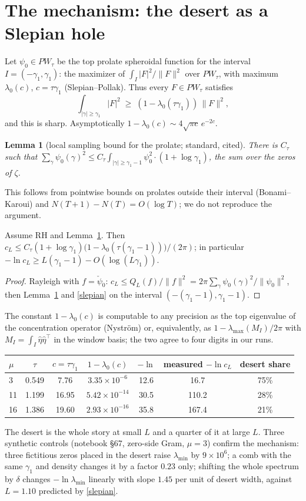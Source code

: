 \documentclass[11pt]{article}
\newtheorem{lemma}[theorem]{Lemma}\newtheorem{conjecture}[theorem]{Conjecture}
\theoremstyle{remark}\newtheorem*{remark}{Remark}
\begin{document}
\section{The mechanism: the desert as a Slepian hole}
Let $\psi_0\in PW_\tau$ be the top prolate spheroidal function for the interval $I=(-\gamma_1,\gamma_1)$: the maximizer of $\int_I|F|^2/\|F\|^2$ over $PW_\tau$, with maximum $\lambda_0(c)$, $c=\tau\gamma_1$ (Slepian--Pollak). Thus every $F\in PW_\tau$ satisfies
\begin{equation}\label{slepian}
\int_{|\gamma|\ge\gamma_1}|F|^2\;\ge\;(1-\lambda_0(\tau\gamma_1))\,\|F\|^2,
\end{equation}
and this is sharp. Asymptotically $1-\lambda_0(c)\sim4\sqrt{\pi c}\,e^{-2c}$.
\begin{lemma}[local sampling bound for the prolate; standard, cited]\label{lem}
There is $C_\tau$ such that $\sum_{\gamma}\psi_0(\gamma)^2\le C_\tau\int_{|\gamma|\ge\gamma_1-1}\psi_0^2\cdot(1+\log\gamma_1)$, the sum over the zeros of $\zeta$.
\end{lemma}
This follows from pointwise bounds on prolates outside their interval (Bonami--Karoui) and $N(T+1)-N(T)=O(\log T)$; we do not reproduce the argument.
\begin{proposition}\label{prop2}
Assume RH and Lemma~\ref{lem}. Then $c_L\le C_\tau(1+\log\gamma_1)\bigl(1-\lambda_0(\tau(\gamma_1-1))\bigr)/(2\pi)$; in particular $-\ln c_L\ge L(\gamma_1-1)-O(\log(L\gamma_1))$.
\end{proposition}
\begin{proof}
Rayleigh with $f=\check\psi_0$: $c_L\le Q_L(f)/\|f\|^2=2\pi\sum_\gamma\psi_0(\gamma)^2/\|\psi_0\|^2$, then Lemma~\ref{lem} and \eqref{slepian} on the interval $(-(\gamma_1-1),\gamma_1-1)$.
\end{proof}
The constant $1-\lambda_0(c)$ is computable to any precision as the top eigenvalue of the concentration operator (Nystr\"om) or, equivalently, as $1-\lambda_{\max}(M_I)/2\pi$ with $M_I=\int_I\hat\eta\hat\eta^{\!\top}$ in the window basis; the two agree to four digits in our runs.
\begin{center}\small
\begin{tabular}{lcccccc}\toprule
$\mu$ & $\tau$ & $c=\tau\gamma_1$ & $1-\lambda_0(c)$ & $-\ln$ & measured $-\ln c_L$ & desert share\\\midrule
3 & 0.549 & 7.76 & $3.35\times10^{-6}$ & 12.6 & 16.7 & 75\%\\
11 & 1.199 & 16.95 & $5.42\times10^{-14}$ & 30.5 & 110.2 & 28\%\\
16 & 1.386 & 19.60 & $2.93\times10^{-16}$ & 35.8 & 167.4 & 21\%\\\bottomrule
\end{tabular}
\end{center}
The desert is the whole story at small $L$ and a quarter of it at large $L$. Three synthetic controls (notebook \S67, zero-side Gram, $\mu=3$) confirm the mechanism: three fictitious zeros placed in the desert raise $\lambda_{\min}$ by $9\times10^6$; a comb with the same $\gamma_1$ and density changes it by a factor $0.23$ only; shifting the whole spectrum by $\delta$ changes $-\ln\lambda_{\min}$ linearly with slope $1.45$ per unit of desert width, against $L=1.10$ predicted by \eqref{slepian}.
\end{document}
